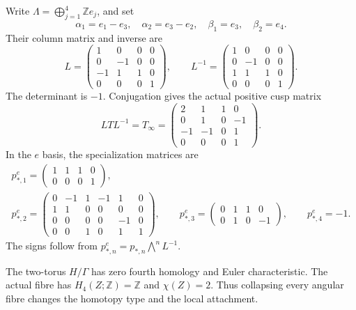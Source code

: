 Write $\Lambda=\bigoplus_{j=1}^4\mathbb Ze_j$, and set
\begin{equation}\label{c26:eq:commonbasis}
\alpha_1=e_1-e_3,\quad \alpha_2=e_3-e_2,\quad
\beta_1=e_3,\quad\beta_2=e_4.
\end{equation}
Their column matrix and inverse are
\[
L=\begin{pmatrix}1&0&0&0\\0&-1&0&0\\-1&1&1&0\\0&0&0&1\end{pmatrix},
\qquad L^{-1}=\begin{pmatrix}1&0&0&0\\0&-1&0&0\\1&1&1&0\\0&0&0&1\end{pmatrix}.
\]
The determinant is $-1$. Conjugation gives the actual positive cusp matrix
\begin{equation}\label{c26:eq:nativemonodromy}
LTL^{-1}=T_\infty=
\begin{pmatrix}2&1&1&0\\0&1&0&-1\\-1&-1&0&1\\0&0&0&1\end{pmatrix}.
\end{equation}
In the $e$ basis, the specialization matrices are
\begin{equation}\label{c26:eq:nativemaps}
\begin{gathered}
p_{*,1}^{e}=\begin{pmatrix}1&1&1&0\\0&0&0&1\end{pmatrix},\\
p_{*,2}^{e}=\begin{pmatrix}
0&-1&1&-1&1&0\\1&1&0&0&0&0\\0&0&0&0&-1&0\\0&0&1&0&1&1
\end{pmatrix},\qquad
p_{*,3}^{e}=\begin{pmatrix}0&1&1&0\\0&1&0&-1\end{pmatrix},\qquad
p_{*,4}^{e}=-1.
\end{gathered}
\end{equation}
The signs follow from $p_{*,n}^{e}=p_{*,n}\bigwedge^nL^{-1}$.

\begin{remark}
The two-torus $H/\Gamma$ has zero fourth homology and Euler characteristic.
The actual fibre has $H_4(Z;\mathbb Z)=\mathbb Z$ and $\chi(Z)=2$.
Thus collapsing every angular fibre changes the homotopy type
and the local attachment.
\end{remark}

